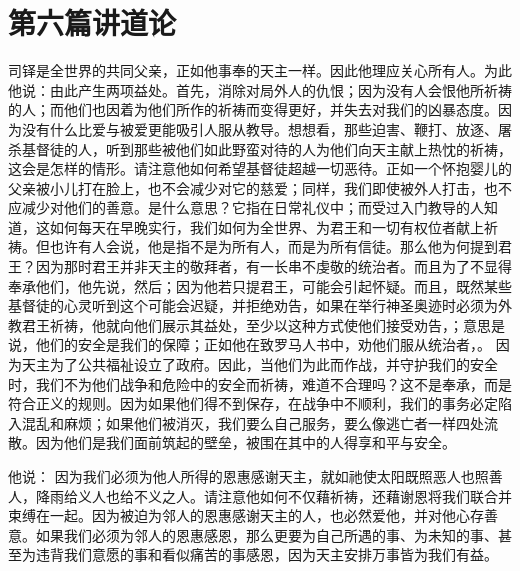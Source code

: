 
\section{第六篇讲道论}

\par

\par

司铎是全世界的共同父亲，正如他事奉的天主一样。因此他理应关心所有人。为此他说：由此产生两项益处。首先，消除对局外人的仇恨；因为没有人会恨他所祈祷的人；而他们也因着为他们所作的祈祷而变得更好，并失去对我们的凶暴态度。因为没有什么比爱与被爱更能吸引人服从教导。想想看，那些迫害、鞭打、放逐、屠杀基督徒的人，听到那些被他们如此野蛮对待的人为他们向天主献上热忱的祈祷，这会是怎样的情形。请注意他如何希望基督徒超越一切恶待。正如一个怀抱婴儿的父亲被小儿打在脸上，也不会减少对它的慈爱；同样，我们即使被外人打击，也不应减少对他们的善意。是什么意思？它指在日常礼仪中；而受过入门教导的人知道，这如何每天在早晚实行，我们如何为全世界、为君王和一切有权位者献上祈祷。但也许有人会说，他是指不是为所有人，而是为所有信徒。那么他为何提到君王？因为那时君王并非天主的敬拜者，有一长串不虔敬的统治者。而且为了不显得奉承他们，他先说，然后；因为他若只提君王，可能会引起怀疑。而且，既然某些基督徒的心灵听到这个可能会迟疑，并拒绝劝告，如果在举行神圣奥迹时必须为外教君王祈祷，他就向他们展示其益处，至少以这种方式使他们接受劝告，；意思是说，他们的安全是我们的保障；正如他在致罗马人书中，劝他们服从统治者，。 因为天主为了公共福祉设立了政府。因此，当他们为此而作战，并守护我们的安全时，我们不为他们战争和危险中的安全而祈祷，难道不合理吗？这不是奉承，而是符合正义的规则。因为如果他们得不到保存，在战争中不顺利，我们的事务必定陷入混乱和麻烦；如果他们被消灭，我们要么自己服务，要么像逃亡者一样四处流散。因为他们是我们面前筑起的壁垒，被围在其中的人得享和平与安全。\par

他说： 因为我们必须为他人所得的恩惠感谢天主，就如祂使太阳既照恶人也照善人，降雨给义人也给不义之人。请注意他如何不仅藉祈祷，还藉谢恩将我们联合并束缚在一起。因为被迫为邻人的恩惠感谢天主的人，也必然爱他，并对他心存善意。如果我们必须为邻人的恩惠感恩，那么更要为自己所遇的事、为未知的事、甚至为违背我们意愿的事和看似痛苦的事感恩，因为天主安排万事皆为我们有益。\par

